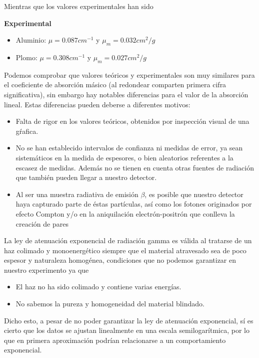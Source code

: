 \documentclass[11pt]{article}
\begin{document}
Mientras que los valores experimentales han sido

\textbf{Experimental}

\begin{itemize}
\item
  Aluminio: \(\mu = 0.087cm^{-1}\) y \(\mu_m = 0.032 cm^2/g\)
\item
  Plomo: \(\mu = 0.308 cm^{-1}\) y \(\mu_m = 0.027 cm^2/g\)
\end{itemize}

Podemos comprobar que valores teóricos y experimentales son muy
similares para el coeficiente de absorción másico (al redondear
comparten primera cifra significativa), sin embargo hay notables
diferencias para el valor de la absorción lineal. Estas diferencias
pueden deberse a diferentes motivos:

\begin{itemize}
\item
  Falta de rigor en los valores teóricos, obtenidos por inspección
  visual de una gŕafica.
\item
  No se han establecido intervalos de confianza ni medidas de error, ya
  sean sistemáticos en la medida de espesores, o bien aleatorios
  referentes a la escasez de medidas. Además no se tienen en cuenta
  otras fuentes de radiación que también pueden llegar a nuestro
  detector.
\item
  Al ser una muestra radiativa de emisión \(\beta\), es posible que
  nuestro detector haya capturado parte de éstas partículas, así como
  los fotones originados por efecto Compton y/o en la aniquilación
  electrón-positrón que conlleva la creación de pares
\end{itemize}

La ley de atenuación exponencial de radiación gamma es válida al
tratarse de un haz colimado y monoenergético siempre que el material
atravesado sea de poco espesor y naturaleza homogénea, condiciones que
no podemos garantizar en nuestro experimento ya que

\begin{itemize}
\item
  El haz no ha sido colimado y contiene varias energías.
\item
  No sabemos la pureza y homogeneidad del material blindado.
\end{itemize}

Dicho esto, a pesar de no poder garantizar la ley de atenuación
exponencial, sí es cierto que los datos se ajustan linealmente en una
escala semilogarítmica, por lo que en primera aproximación podrían
relacionarse a un comportamiento exponencial.
\end{document}
